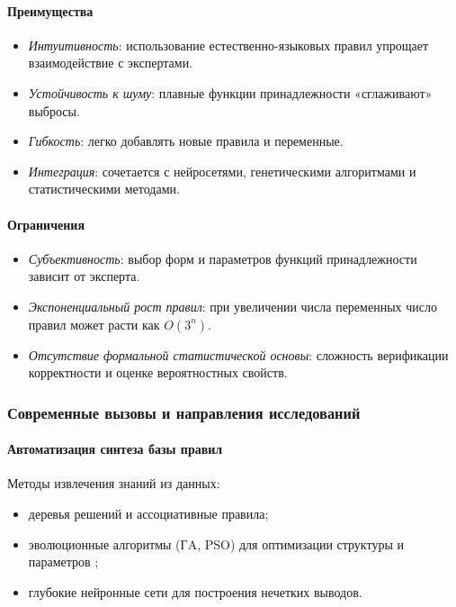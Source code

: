 \paragraph{Преимущества}
\begin{itemize}
  \item \textit{Интуитивность}: использование естественно-языковых правил упрощает взаимодействие с экспертами.
  \item \textit{Устойчивость к шуму}: плавные функции принадлежности «сглаживают» выбросы.
  \item \textit{Гибкость}: легко добавлять новые правила и переменные.
  \item \textit{Интеграция}: сочетается с нейросетями, генетическими алгоритмами и статистическими методами.
\end{itemize}

\paragraph{Ограничения}
\begin{itemize}
  \item \textit{Субъективность}: выбор форм и параметров функций принадлежности зависит от эксперта.
  \item \textit{Экспоненциальный рост правил}: при увеличении числа переменных число правил может расти как \(O(3^n)\).
  \item \textit{Отсутствие формальной статистической основы}: сложность верификации корректности и оценке вероятностных свойств.
\end{itemize}

\subsubsection{Современные вызовы и направления исследований}
\label{subsec:challenges}

\paragraph{Автоматизация синтеза базы правил}


Методы извлечения знаний из данных:
\begin{itemize}
  \item деревья решений и ассоциативные правила;
  \item эволюционные алгоритмы (ГA, PSO) для оптимизации структуры и параметров \cite{Pedrycz1993};
  \item глубокие нейронные сети для построения нечетких выводов.
\end{itemize}

